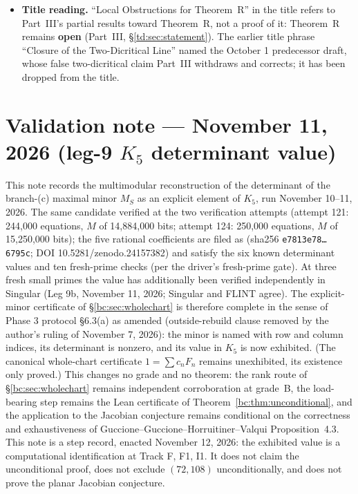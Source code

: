 \documentclass[a4paper,11pt]{article}
\newcommand{\filename}[1]{\texttt{\seqsplit{#1}}}
\theoremstyle{plain}
\theoremstyle{definition}
\theoremstyle{remark}
\begin{document}
\begin{itemize}[nosep]
\item \textbf{Title reading.} ``Local Obstructions for Theorem~R'' in the title refers to Part~III's partial results toward Theorem~R, not a proof of it: Theorem~R remains \textbf{open} (Part~III, \S\ref{td:sec:statement}). The earlier title phrase ``Closure of the Two-Dicritical Line'' named the October 1 predecessor draft, whose false two-dicritical claim Part~III withdraws and corrects; it has been dropped from the title.
\end{itemize}

\section*{Validation note --- November 11, 2026 (leg-9 $K_5$ determinant value)}
This note records the multimodular reconstruction of the determinant of the branch-(c) maximal minor $M_S$ as an explicit element of $K_5$, run November 10--11, 2026. The same candidate verified at the two verification attempts (attempt 121: 244,000 equations, $M$ of 14,884,000 bits; attempt 124: 250,000 equations, $M$ of 15,250,000 bits); the five rational coefficients are filed as \filename{gghv-dependency-closure/leg9/result.json} (sha256 \texttt{e7813e78\ldots 6795c}; DOI 10.5281/zenodo.24157382) and satisfy the six known determinant values and ten fresh-prime checks (per the driver's fresh-prime gate). At three fresh small primes the value has additionally been verified independently in Singular (Leg 9b, November 11, 2026; Singular and FLINT agree). The explicit-minor certificate of \S\ref{bc:sec:wholechart} is therefore complete in the sense of Phase 3 protocol \S6.3(a) as amended (outside-rebuild clause removed by the author's ruling of November 7, 2026): the minor is named with row and column indices, its determinant is nonzero, and its value in $K_5$ is now exhibited. (The canonical whole-chart certificate $1=\sum c_nF_n$ remains unexhibited, its existence only proved.) This changes no grade and no theorem: the rank route of \S\ref{bc:sec:wholechart} remains independent corroboration at grade~B, the load-bearing step remains the Lean certificate of Theorem~\ref{bc:thm:unconditional}, and the application to the Jacobian conjecture remains conditional on the correctness and exhaustiveness of Guccione--Guccione--Horruitiner--Valqui Proposition~4.3. This note is a step record, enacted November 12, 2026: the exhibited value is a computational identification at Track F, F1, I1. It does not claim the unconditional proof, does not exclude $(72,108)$ unconditionally, and does not prove the planar Jacobian conjecture.
\end{document}
